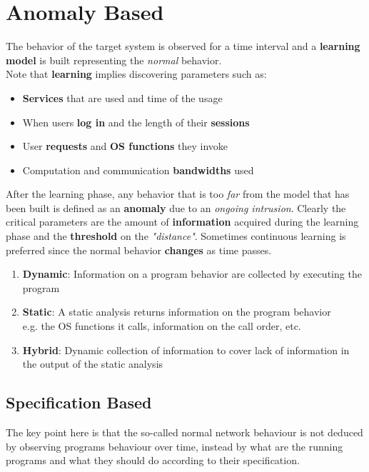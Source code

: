 \section{Anomaly Based}
The behavior of the target system is observed for a time interval and a \textbf{learning model} is built representing the \textit{normal} behavior.\\
Note that \textbf{learning} implies discovering parameters such as:
\begin{itemize}
   \item \textbf{Services} that are used and time of the usage
   \item When users \textbf{log in} and the length of their \textbf{sessions}
   \item User \textbf{requests} and \textbf{OS functions} they invoke
   \item Computation and communication \textbf{bandwidths} used
\end{itemize}
After the learning phase, any behavior that is too \textit{far} from the model that has
been built is defined as an \textbf{anomaly} due to an \textit{ongoing intrusion}.\nl
Clearly the critical parameters are the amount of \textbf{information} acquired during the learning phase and the \textbf{threshold} on the \textit{"distance"}.
Sometimes continuous learning is preferred since the normal behavior \textbf{changes} as time passes.

\begin{enumerate}
   \item \textbf{Dynamic}:
   Information on a program behavior are collected by executing the program
   \item \textbf{Static}:
   A static analysis returns information on the program behavior\\
   e.g. the OS functions it calls, information on the call order, etc.
   \item \textbf{Hybrid}:
   Dynamic collection of information to cover lack of information in the output of the static analysis
\end{enumerate}

\subsection{Specification Based}
The key point here is that the so-called normal network behaviour is not deduced by observing programs behaviour over time,
instead by what are the running programs and what they should do according to their specification. 